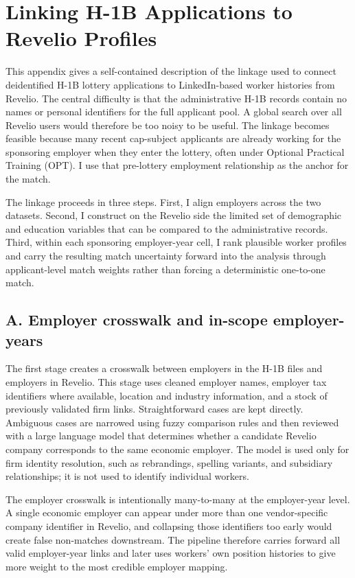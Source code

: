 \clearpage
\section{Linking H-1B Applications to Revelio Profiles}
\label{sec:appendix_linkage}

This appendix gives a self-contained description of the linkage used to connect deidentified H-1B lottery applications to LinkedIn-based worker histories from Revelio. The central difficulty is that the administrative H-1B records contain no names or personal identifiers for the full applicant pool. A global search over all Revelio users would therefore be too noisy to be useful. The linkage becomes feasible because many recent cap-subject applicants are already working for the sponsoring employer when they enter the lottery, often under Optional Practical Training (OPT). I use that pre-lottery employment relationship as the anchor for the match.

The linkage proceeds in three steps. First, I align employers across the two datasets. Second, I construct on the Revelio side the limited set of demographic and education variables that can be compared to the administrative records. Third, within each sponsoring employer-year cell, I rank plausible worker profiles and carry the resulting match uncertainty forward into the analysis through applicant-level match weights rather than forcing a deterministic one-to-one match.

\subsection{A. Employer crosswalk and in-scope employer-years}

The first stage creates a crosswalk between employers in the H-1B files and employers in Revelio. This stage uses cleaned employer names, employer tax identifiers where available, location and industry information, and a stock of previously validated firm links. Straightforward cases are kept directly. Ambiguous cases are narrowed using fuzzy comparison rules and then reviewed with a large language model that determines whether a candidate Revelio company corresponds to the same economic employer. The model is used only for firm identity resolution, such as rebrandings, spelling variants, and subsidiary relationships; it is not used to identify individual workers.

The employer crosswalk is intentionally many-to-many at the employer-year level. A single economic employer can appear under more than one vendor-specific company identifier in Revelio, and collapsing those identifiers too early would create false non-matches downstream. The pipeline therefore carries forward all valid employer-year links and later uses workers' own position histories to give more weight to the most credible employer mapping.

